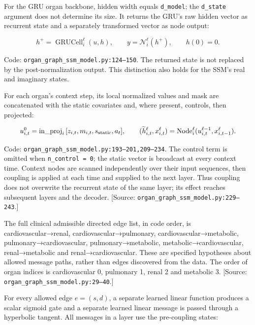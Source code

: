 For the GRU organ backbone, hidden width equals \texttt{d\_\allowbreak{}model}; the \texttt{d\_\allowbreak{}state} argument does not determine its size. It returns the GRU's raw hidden vector as recurrent state and a separately transformed vector as node output:

\[
h^+=\operatorname{GRUCell}_i^\ell(u,h),\qquad y=\mathcal N_i^\ell(h^+),\qquad h(0)=0.
\]


Code: \texttt{organ\_\allowbreak{}graph\_\allowbreak{}ssm\_\allowbreak{}model.\allowbreak{}py:\allowbreak{}124–\allowbreak{}150}. The returned state is not replaced by the post-normalization output. This distinction also holds for the SSM's real and imaginary states.

For each organ's context step, its local normalized values and mask are concatenated with the static covariates and, where present, controls, then projected:

\[
u_{i,t}^{0}=\mathrm{in\_proj}_i\,[z_{i,t},m_{i,t},s_{\rm static},a_t],\qquad
(\widetilde h_{i,t}^{\ell},x_{i,t}^{\ell})=
 \mathrm{Node}_i^\ell(u_{i,t}^{\ell-1},x_{i,t-1}^{\ell}).
\]


Code: \texttt{organ\_\allowbreak{}graph\_\allowbreak{}ssm\_\allowbreak{}model.\allowbreak{}py:\allowbreak{}193–\allowbreak{}201,\allowbreak{}209–\allowbreak{}234}. The control term is omitted when \texttt{n\_\allowbreak{}control =\allowbreak{} 0}; the static vector is broadcast at every context time. Context nodes are scanned independently over their input sequences, then coupling is applied at each time and supplied to the next layer. Thus coupling does not overwrite the recurrent state of the same layer; its effect reaches subsequent layers and the decoder. [Source: \texttt{organ\_\allowbreak{}graph\_\allowbreak{}ssm\_\allowbreak{}model.\allowbreak{}py:\allowbreak{}229–\allowbreak{}243}.]

The full clinical admissible directed edge list, in code order, is cardiovascular→renal, cardiovascular→pulmonary, cardiovascular→metabolic, pulmonary→cardiovascular, pulmonary→metabolic, metabolic→cardiovascular, renal→metabolic and renal→cardiovascular. These are specified hypotheses about allowed message paths, rather than edges discovered from the data. The order of organ indices is cardiovascular 0, pulmonary 1, renal 2 and metabolic 3. [Source: \texttt{organ\_\allowbreak{}graph\_\allowbreak{}ssm\_\allowbreak{}model.\allowbreak{}py:\allowbreak{}29–\allowbreak{}40}.]

For every allowed edge \(e=(s,d)\), a separate learned linear function produces a scalar sigmoid gate and a separate learned linear message is passed through a hyperbolic tangent. All messages in a layer use the pre-coupling states:

